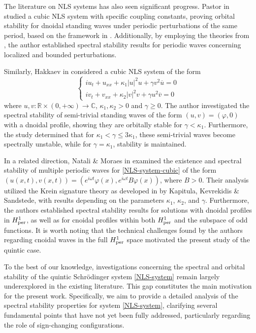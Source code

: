 \documentclass[10pt,reqno,a4paper]{amsart} %
\theoremstyle{definition} %
\numberwithin{equation}{section}
\numberwithin{figure}{section}
\begin{document}
The literature on NLS systems has also seen significant progress. Pastor in \cite{Pastor} studied a cubic NLS system with specific coupling constants, proving orbital stability for dnoidal standing waves under periodic perturbations of the same period, based on the framework in \cite{grillakis1, grillakis2}. Additionally, by employing the theories from \cite{GallayHaragusJDE, grillakis1}, the author established spectral stability results for periodic waves concerning localized and bounded perturbations.

Similarly, Hakkaev in \cite{Hakkaev2019} considered a cubic NLS system of the form
\begin{equation}\label{NLS-system-cubic}
	\left\{ \begin{array}{l}
		i u_t + u_{xx} + \kappa_1 |u|^2 u + \gamma v^2 \overline{u} = 0 \\
		i v_t + v_{xx} + \kappa_2 |v|^2 v + \gamma u^2 \overline{v} = 0
	\end{array}
\right.
\end{equation}
where $u, v : \mathbb{R} \times (0, +\infty) \to \mathbb{C}$,  $\kappa_1,\kappa_2>0$ and $\gamma \geq 0$. The author investigated the spectral stability of semi-trivial standing waves of the form $(u,v) = (\varphi,0)$ with a dnoidal profile, showing they are orbitally stable for $\gamma < \kappa_1$. Furthermore, the study determined that for $\kappa_1 < \gamma \leq 3\kappa_1$, these semi-trivial waves become spectrally unstable, while for $\gamma = \kappa_1$, stability is maintained. 

In a related direction, Natali \& Moraes in \cite{NataliBittencourt2024} examined the existence and spectral stability of multiple periodic waves for \eqref{NLS-system-cubic} of the form \((u(x,t), v(x,t)) = \left( e^{i \omega t} \varphi(x), e^{i \omega t} B \varphi(x) \right)\), where $B>0$. Their analysis utilized the Krein signature theory as developed in \cite{KapitulaKevrekidisSandstedeI, KapitulaKevrekidisSandstedeII} by Kapitula, Kevrekidis \&  Sandstede, with results depending on the parameters $\kappa_1$, $\kappa_2$, and $\gamma$. Furthermore, the authors established spectral stability results for solutions with dnoidal profiles in $H^1_{\rm per}$, as well as for cnoidal profiles within both $H^1_{\rm per}$ and the subspace of odd functions. It is worth noting that the technical challenges found by the authors regarding cnoidal waves in the full $H^1_{\rm per}$ space motivated the present study of the quintic case.

To the best of our knowledge, investigations concerning the spectral and orbital stability of the quintic Schrödinger system \eqref{NLS-system} remain largely underexplored in the existing literature. This gap constitutes the main motivation for the present work. Specifically, we aim to provide a detailed analysis of the spectral stability properties for system \eqref{NLS-system}, clarifying several fundamental points that have not yet been fully addressed, particularly regarding the role of sign-changing configurations.
\end{document}
